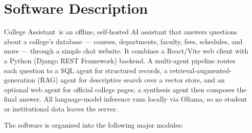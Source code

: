 \documentclass[11pt,a4paper]{article}
\newcommand{\SoftwareName}{College Assistant}
\begin{document}
\section*{Software Description}

\SoftwareName\ is an offline, self-hosted AI assistant that answers
questions about a college's database --- courses, departments, faculty,
fees, schedules, and more --- through a simple chat website. It combines a
React/Vite web client with a Python (Django REST Framework) backend. A
multi-agent pipeline routes each question to a SQL agent for structured
records, a retrieval-augmented-generation (RAG) agent for descriptive
search over a vector store, and an optional web agent for official college
pages; a synthesis agent then composes the final answer. All language-model
inference runs locally via Ollama, so no student or institutional data
leaves the server.

The software is organised into the following major modules:
\end{document}
